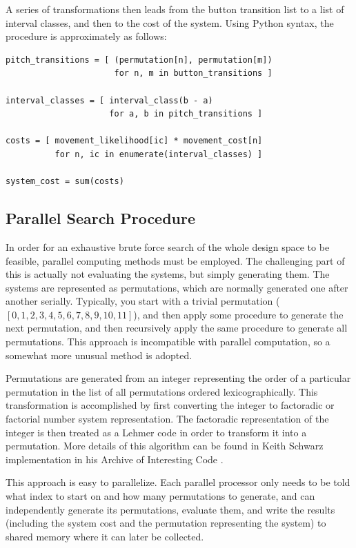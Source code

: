 \documentclass[sigconf]{nimeart}
\begin{document}
A series of transformations then leads from the button transition list to a list of interval classes, and then to the cost of the system. Using Python syntax, the procedure is approximately as follows:

\begin{Verbatim}[breaklines=true,breakanywhere=true,fontsize=\footnotesize]
pitch_transitions = [ (permutation[n], permutation[m])
                      for n, m in button_transitions ]

interval_classes = [ interval_class(b - a)
                     for a, b in pitch_transitions ]

costs = [ movement_likelihood[ic] * movement_cost[n]
          for n, ic in enumerate(interval_classes) ]

system_cost = sum(costs)
\end{Verbatim}

\subsection{Parallel Search Procedure}\label{parallel-search-procedure}

In order for an exhaustive brute force search of the whole design space to be feasible, parallel computing methods must be employed. The challenging part of this is actually not evaluating the systems, but simply generating them. The systems are represented as permutations, which are normally generated one after another serially. Typically, you start with a trivial permutation ($[0,1,2,3,4,5,6,7,8,9,10,11]$), and then apply some procedure to generate the next permutation, and then recursively apply the same procedure to generate all permutations. This approach is incompatible with parallel computation, so a somewhat more unusual method is adopted.

Permutations are generated from an integer representing the order of a particular permutation in the list of all permutations ordered lexicographically. This transformation is accomplished by first converting the integer to factoradic or factorial number system representation. The factoradic representation of the integer is then treated as a Lehmer code in order to transform it into a permutation. More details of this algorithm can be found in Keith Schwarz implementation in his Archive of Interesting Code \cite{schwarz_2011}.

This approach is easy to parallelize. Each parallel processor only needs to be told what index to start on and how many permutations to generate, and can independently generate its permutations, evaluate them, and write the results (including the system cost and the permutation representing the system) to shared memory where it can later be collected.
\end{document}
